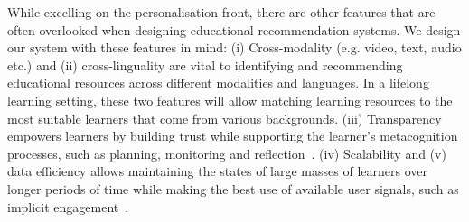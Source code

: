 \documentclass[letterpaper]{article} %
\begin{document}




While excelling on the personalisation front, there are other features that are often overlooked when designing educational recommendation systems. We design our system with these features in mind:
(i) {Cross-modality} (e.g. video, text, audio etc.) and (ii) {cross-linguality} are vital to identifying and recommending educational resources across different modalities and languages. In a lifelong learning setting, these two features will allow matching learning resources to the most suitable learners that come from various backgrounds. (iii) {Transparency} empowers learners by building trust while supporting the learner's metacognition processes, such as planning, monitoring and reflection~\cite{Bull2016}. (iv) {Scalability} and (v) {data efficiency} allows maintaining the states of large masses of learners over longer periods of time while making the best use of available user signals, such as implicit engagement~\cite{Salehi2014}.


\end{document}
